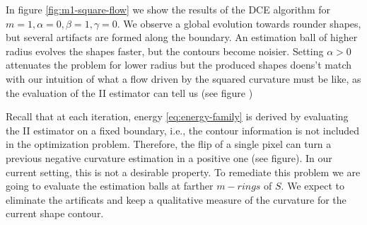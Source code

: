 In figure \ref{fig:m1-square-flow} we show the results of the DCE algorithm for $m=1,\alpha=0, \beta=1, \gamma=0$. We observe a global evolution towards rounder shapes, but several artifacts are formed along the boundary. An estimation ball of higher radius evolves the shapes faster, but the contours become noisier. Setting $\alpha >0$ attenuates the problem for lower radius but the produced shapes doens't match with our intuition of what a flow driven by the squared curvature must be like, as the evaluation of the II estimator can tell us (see figure )


Recall that at each iteration, energy \eqref{eq:energy-family} is derived by evaluating the II estimator on a fixed boundary, i.e., the contour information is not included in the optimization problem. 
Therefore, the flip of a single pixel can turn a previous negative curvature estimation in a positive one (see figure). In our current setting, this is not a desirable property. To remediate this problem we are going to evaluate the estimation balls at farther $m-rings$ of $S$. We expect to eliminate the artificats and keep a qualitative measure of the curvature for the current shape contour.



